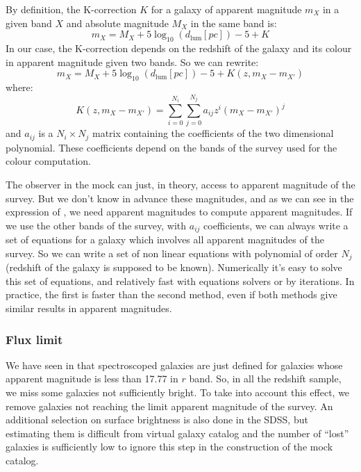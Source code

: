 By definition, the K-correction $K$ for a galaxy of apparent magnitude $m_X$
in a given band $X$ and absolute magnitude $M_X$ in the same band is:
%
\begin{equation}
    m_X=M_X + 5\log_{10}\left(d_\mathrm{lum}\left[pc\right]\right) - 5 + K
\end{equation}
%
In our case, the K-correction depends on the redshift of the galaxy and its
colour in apparent magnitude given two bands. So we can rewrite:
%
\begin{equation}
    \label{eq:appmag}
    m_X=M_X +
        5\log_{10}\left(d_\mathrm{lum}\left[pc\right]\right) - 5 +
        K\left(z, m_X - m_{X'}\right)
\end{equation}
%
where:
%
\begin{equation}
    K\left(z,m_X-m_{X'}\right)=\sum_{i=0}^{N_i}\sum_{j=0}^{N_j} a_{ij} z^i
    {\left(m_X-m_{X'}\right)}^j
\end{equation}
%
and $a_{ij}$ is a $N_i\times N_j$ matrix containing the coefficients of the
two dimensional polynomial. These coefficients depend on the bands of the
survey used for the colour computation.

The observer in the mock can just, in theory, access to apparent magnitude of
the survey. But we don't know in advance these magnitudes, and as we can see in
the expression of , we need apparent magnitudes to
compute apparent magnitudes. If we use the other bands of the survey, with
$a_{ij}$ coefficients, we can always write a set of equations for a galaxy
which involves all apparent magnitudes of the survey. So we can write a set of
non linear equations with polynomial of order $N_j$ (redshift of the galaxy is
supposed to be known). Numerically it's easy to solve this set of equations,
and relatively fast with equations solvers or by iterations. In practice, the
first is faster than the second method, even if both methods give similar
results in apparent magnitudes.

\subsubsection{Flux limit}

We have seen in  that spectroscoped galaxies are just
defined for galaxies whose apparent magnitude is less than 17.77 in $r$ band.
So, in all the redshift sample, we miss some galaxies not sufficiently bright.
To take into account this effect, we remove galaxies not reaching the limit
apparent magnitude of the survey. An additional selection on surface
brightness is also done in the SDSS, but estimating them is difficult from
virtual galaxy catalog and the number of ``lost'' galaxies is sufficiently low
to ignore this step in the construction of the mock catalog.


